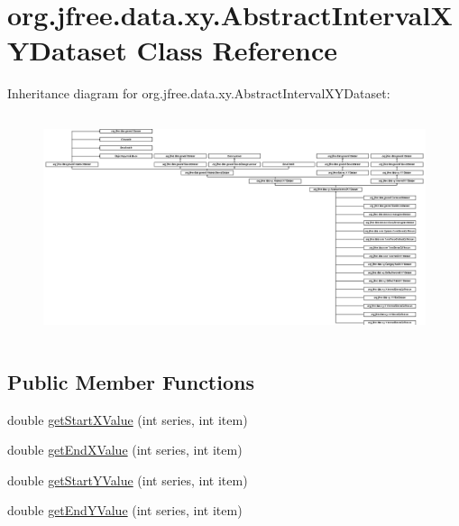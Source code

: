 \hypertarget{classorg_1_1jfree_1_1data_1_1xy_1_1_abstract_interval_x_y_dataset}{}\section{org.\+jfree.\+data.\+xy.\+Abstract\+Interval\+X\+Y\+Dataset Class Reference}
\label{classorg_1_1jfree_1_1data_1_1xy_1_1_abstract_interval_x_y_dataset}
Inheritance diagram for org.\+jfree.\+data.\+xy.\+Abstract\+Interval\+X\+Y\+Dataset\+:\begin{figure}[H]
\begin{center}
\leavevmode
\includegraphics[height=6.530612cm]{classorg_1_1jfree_1_1data_1_1xy_1_1_abstract_interval_x_y_dataset}
\end{center}
\end{figure}
\subsection*{Public Member Functions}
\begin{DoxyCompactItemize}
\item 
double \mbox{\hyperlink{classorg_1_1jfree_1_1data_1_1xy_1_1_abstract_interval_x_y_dataset_a17554a8ef17203f1c12cbeaed806d092}{get\+Start\+X\+Value}} (int series, int item)
\item 
double \mbox{\hyperlink{classorg_1_1jfree_1_1data_1_1xy_1_1_abstract_interval_x_y_dataset_ac91570775b0aff8d6acf1316a87ea551}{get\+End\+X\+Value}} (int series, int item)
\item 
double \mbox{\hyperlink{classorg_1_1jfree_1_1data_1_1xy_1_1_abstract_interval_x_y_dataset_a93b54cecb442bfe1e268d75c1e9a0fee}{get\+Start\+Y\+Value}} (int series, int item)
\item 
double \mbox{\hyperlink{classorg_1_1jfree_1_1data_1_1xy_1_1_abstract_interval_x_y_dataset_a31d20f77610d2b39a1401a48e06181c1}{get\+End\+Y\+Value}} (int series, int item)
\end{DoxyCompactItemize}
